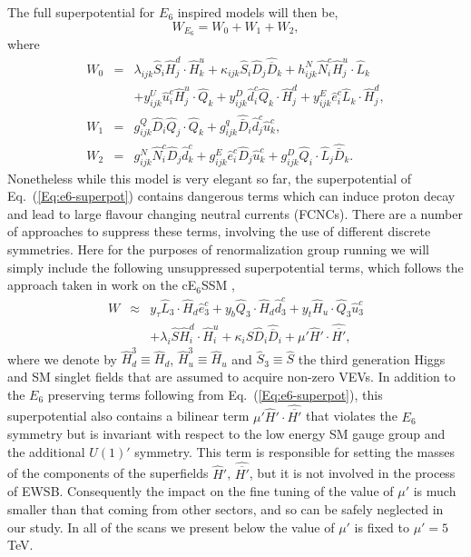 \documentclass[preprint,amsmath,amssymb,aps,superscriptaddress,prd,
showpacs,floatfix,nofootinbib]{revtex4-1}
\newcommand{\be}{\begin{equation}}
\newcommand{\ee}{\end{equation}}
\newcommand{\ba}{\begin{eqnarray}}
\newcommand{\ea}{\end{eqnarray}}
\newcommand{\SuperField}[1]{\hat{#1}}
\begin{document}
The full superpotential for $E_6$ inspired models will then be,
\be
W_{E_6} = W_0 + W_1 + W_2 , \label{Eq:e6-superpot}
\ee
where
\begin{eqnarray}
W_0 &=& \lambda_{ijk} \hat{S}_i \hat{H}^d_{j} \cdot\hat{H}^u_{k} +
\kappa_{ijk} \hat{S}_i \hat{D}_j \hat{\overline{D}}_k + h^N_{ijk} \hat{N}^c_i
\hat{H}^u_{j} \cdot \hat{L}_k \nonumber \\
& & + y^U_{ijk} \hat{u}^c_i \hat{H}^u_{j} \cdot \hat{Q}_k + y^D_{ijk}
\hat{d}^c_i \hat{Q}_k \cdot \hat{H}^d_{j} + y^E_{ijk} \hat{e}^c_i \hat{L}_k
\cdot\hat{H}^d_{j} , \\
W_1 &=& g^Q_{ijk} \hat{D}_i \hat{Q}_j \cdot \hat{Q}_k + g^q_{ijk}
\hat{\bar{D}}_i \hat{d}^c_j \hat{u}^c_k , \\
W_2 &=& g^N_{ijk} \hat{N}^c_i \hat{D}_j \hat{d}^c_k + g^E_{ijk} \hat{e}^c_i
\hat{D}_j \hat{u}^c_k + g^D_{ijk} \hat{Q}_i \cdot \hat{L}_j \hat{\bar{D}}_k .
\label{Eq:e6-superpot-parts}
\end{eqnarray}
Nonetheless while this model is very elegant so far, the
superpotential of Eq.~(\ref{Eq:e6-superpot}) contains dangerous terms which
can induce proton decay and lead to large flavour changing neutral
currents (FCNCs).  There are a number of approaches to suppress these
terms, involving the use of different discrete symmetries.  Here for
the purposes of renormalization group running we will simply include
the following unsuppressed superpotential terms, which follows the
approach taken in work on the cE$_6$SSM \cite{Athron:2009ue, Athron:2009bs},
%
    \ba
    W &\approx& y_{\tau} \SuperField{L}_3 \cdot \SuperField{H}_d
      \SuperField{e}^c_3 + y_b \SuperField{Q}_3\cdot\SuperField{H}_d
      \SuperField{d}_3^c + y_t \SuperField{H}_u\cdot\SuperField{Q}_3
      \SuperField{u}_3^c\nonumber\\
    &&
    + \lambda_i \SuperField{S} \SuperField{H}_i^d
    \cdot \SuperField{H}_i^u  + \kappa_i \SuperField{S} \SuperField{D}_i
    \SuperField{\overline{D}}_i + \mu' \SuperField{H}'\cdot
    \SuperField{\overline{H'}},
    \ea
  \label{SuPot_RGE}
%
where we denote by $\SuperField{H}_d^3 \equiv \SuperField{H}_d$,
$\SuperField{H}_u^3 \equiv \SuperField{H}_u$ and $\SuperField{S}_3 \equiv
\SuperField{S}$ the third generation Higgs and SM singlet fields that are
assumed to acquire non-zero VEVs.  In addition to the $E_6$ preserving terms
following from Eq.~(\ref{Eq:e6-superpot}), this superpotential also contains a
bilinear term $\mu' \SuperField{H}'\cdot \SuperField{\overline{H'}}$ that
violates the $E_6$ symmetry but is invariant with respect to the low energy SM
gauge group and the additional $U(1)'$ symmetry.  This term is responsible for
setting the masses of the components of the superfields $\SuperField{H}'$,
$\SuperField{\overline{H'}}$, but it is not involved in the process of EWSB.
Consequently the impact on the fine tuning of the value of $\mu'$ is much
smaller than that coming from other sectors, and so can be safely neglected
in our study. In all of the scans we present below the value of $\mu'$ is
fixed to $\mu' = 5$ TeV.
\end{document}
